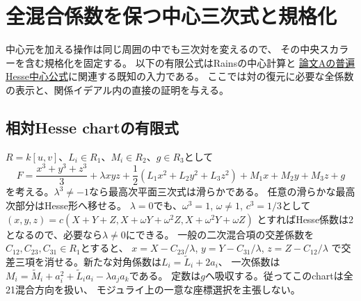 \section{全混合係数を保つ中心三次式と規格化}
\label{sec:pair-explicit-centers}
中心元を加える操作は同じ周囲の中でも三次対を変えるので、
その中央スカラーを含む規格化を固定する。
以下の有限公式はRainsの中心計算\cite[\S9.1]{EG}と
\href{https://github.com/uedakazushi/nc-cubic/blob/main/papers/support/papers/sections/hesse_mixed_universal_center.tex}
{論文Aの普遍Hesse中心公式}に関連する既知の入力である。
ここでは対の復元に必要な全係数の表示と、関係イデアル内の直接の証明を与える。

\subsection{相対Hesse chartの有限式}
$R=k[u,v]$、$L_i\in R_1$、$M_i\in R_2$、$g\in R_3$として
\[
 F=\frac{x^3+y^3+z^3}{3}+\lambda xyz
   +\frac12(L_1x^2+L_2y^2+L_3z^2)+M_1x+M_2y+M_3z+g
\]
を考える。$\lambda^3\ne-1$なら最高次平面三次式は滑らかである。
任意の滑らかな最高次部分はHesse形へ移せる。
$\lambda=0$でも、$\omega^3=1$, $\omega\ne1$, $c^3=1/3$として
$(x,y,z)=c(X+Y+Z,X+\omega Y+\omega^2Z,X+\omega^2Y+\omega Z)$
とすればHesse係数は2となるので、必要なら$\lambda\ne0$にできる。
一般の二次混合項の交差係数を$C_{12},C_{23},C_{31}\in R_1$とすると、
$x=X-C_{23}/\lambda$, $y=Y-C_{31}/\lambda$, $z=Z-C_{12}/\lambda$
で交差三項を消せる。新たな対角係数は$L_i=\widetilde L_i+2a_i$、
一次係数は$M_i=\widetilde M_i+a_i^2+\widetilde L_i a_i-\lambda a_ja_k$である。
定数は$g$へ吸収する。従ってこのchartは全21混合方向を扱い、
モジュライ上の一意な座標選択を主張しない。

